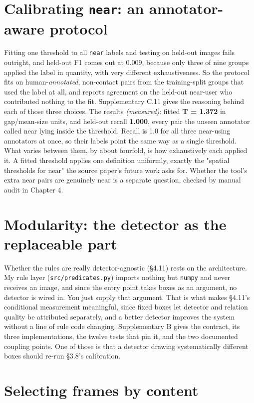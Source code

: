\section{Calibrating \texttt{near}: an annotator-aware protocol}

Fitting one threshold to all \texttt{near} labels and testing on held-out images fails outright, and held-out F1 comes out at 0.009, because only three of nine groups applied the label in quantity, with very different exhaustiveness. So the protocol fits on human-\textit{annotated}, non-contact pairs from the training-split groups that used the label at all, and reports agreement on the held-out near-user who contributed nothing to the fit. Supplementary C.11 gives the reasoning behind each of those three choices. The results \textit{(measured)}: fitted \textbf{T = 1.372} in gap/mean-size units, and held-out recall \textbf{1.000}, every pair the unseen annotator called near lying inside the threshold. Recall is 1.0 for all three near-using annotators at once, so their labels point the same way as a single threshold. What varies between them, by about fourfold, is how exhaustively each applied it. A fitted threshold applies one definition uniformly, exactly the "spatial thresholds for near" the source paper's future work asks for. Whether the tool's extra near pairs are genuinely near is a separate question, checked by manual audit in Chapter 4.

\section{Modularity: the detector as the replaceable part}

Whether the rules are really detector-agnostic (\S{}4.11) rests on the architecture. My rule layer (\texttt{src/predicates.py}) imports nothing but \texttt{numpy} and never receives an image, and since the entry point takes boxes as an argument, no detector is wired in. You just supply that argument. That is what makes \S{}4.11's conditional measurement meaningful, since fixed boxes let detector and relation quality be attributed separately, and a better detector improves the system without a line of rule code changing. Supplementary B gives the contract, its three implementations, the twelve tests that pin it, and the two documented coupling points. One of those is that a detector drawing systematically different boxes should re-run \S{}3.8's calibration.

\section{Selecting frames by content}

